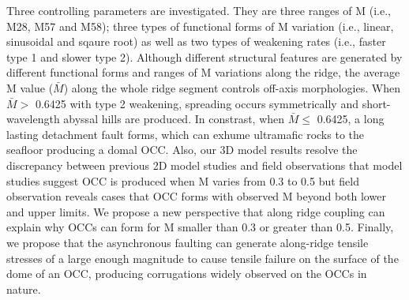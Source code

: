 \documentclass[draft,gc]{agutex}
\begin{document}
\begin{article}
Three controlling parameters are investigated. They are three ranges of M (i.e., M28, M57 and M58); three types of functional forms of M variation (i.e., linear, sinusoidal and sqaure root) as well as two types of weakening rates (i.e., faster type 1 and slower type 2). Although different structural features are generated by different functional forms and ranges of M variations along the ridge, the average M value ($\bar{M}$) along the whole ridge segment controls off-axis morphologies. When $\bar{M} >$ 0.6425 with type 2 weakening, spreading occurs symmetrically and short-wavelength abyssal hills are produced. In constrast, when $\bar{M} \le$ 0.6425, a long lasting detachment fault forms, which can exhume ultramafic rocks to the seafloor producing a domal OCC. Also, our 3D model results resolve the discrepancy between previous 2D model studies and field observations that model studies suggest OCC is produced when M varies from 0.3 to 0.5 but field observation reveals cases that OCC forms with observed M beyond both lower and upper limits. We propose a new perspective that along ridge coupling can explain why OCCs can form for M smaller than 0.3 or greater than 0.5. Finally, we propose that the asynchronous faulting can generate along-ridge tensile stresses of a large enough magnitude to cause tensile failure on the surface of the dome of an OCC, producing corrugations widely observed on the OCCs in nature.





%
%
%
%
%
%
%


\end{article}
\end{document}
